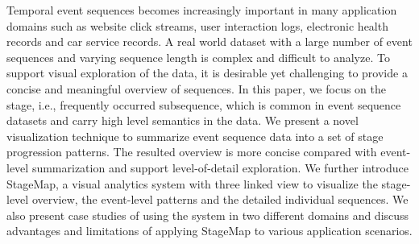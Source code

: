 Temporal event sequences becomes increasingly important in many application domains such as website click streams, user interaction logs, electronic health records and car service records. A real world dataset with a large number of event sequences and varying sequence length is complex and difficult to analyze. To support visual exploration of the data, it is desirable yet challenging to provide a concise and meaningful overview of sequences. In this paper, we focus on the stage, i.e., frequently occurred subsequence, which is common in event sequence datasets and carry high level semantics in the data. We present a novel visualization technique to summarize event sequence data into a set of stage progression patterns. The resulted overview is more concise compared with event-level summarization and support level-of-detail exploration. We further introduce StageMap, a visual analytics system with three linked view to visualize the stage-level overview, the event-level patterns and the detailed individual sequences. We also present case studies of using the system in two different domains and discuss advantages and limitations of applying StageMap to various application scenarios.